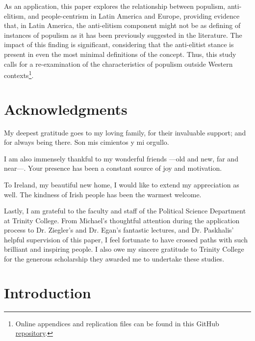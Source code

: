 \documentclass[12pt,letterpaper]{article}
\begin{document}
As an application, this paper explores the relationship between populism, anti-elitism, and people-centrism in Latin America and Europe, providing evidence that, in Latin America, the anti-elitism component might not be as defining of instances of populism as it has been previously suggested in the literature. The impact of this finding is significant, considering that the anti-elitist stance is present in even the most minimal definitions of the concept. Thus, this study calls for a re-examination of the characteristics of populism outside Western contexts\footnote{Online appendices and replication files can be found in this GitHub \textcolor{blue}{\href{https://github.com/sarabcidf/populism_tcd}{repository}}.}.

\section*{Acknowledgments}

\vspace{.25cm}
\noindent My deepest gratitude goes to my loving family, for their invaluable support; and for always being there. Son mis cimientos y mi orgullo. 

\vspace{.25cm}
\noindent I am also immensely thankful to my wonderful friends —old and new, far and near—. Your presence has been a constant source of joy and motivation. 

\vspace{.25cm}
\noindent To Ireland, my beautiful new home, I would like to extend my appreciation as well. The kindness of Irish people has been the warmest welcome. 

\vspace{.25cm}
\noindent Lastly, I am grateful to the faculty and staff of the Political Science Department at Trinity College. From Michael's thoughtful attention during the application process to Dr. Ziegler's and Dr. Egan's fantastic lectures, and Dr. Paskhalis' helpful supervision of this paper, I feel fortunate to have crossed paths with such brilliant and inspiring people. I also owe my sincere gratitude to Trinity College for the generous scholarship they awarded me to undertake these studies. 


\tableofcontents
\listoffigures
\listoftables

\section{Introduction}
\end{document}
